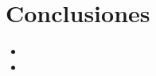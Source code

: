 \chapter{Conclusiones}
\label{conclusiones}

\lipsum[1-1]

\begin{itemize}
	\item \lipsum[1-1]
	\item \lipsum[2-2]
\end{itemize}